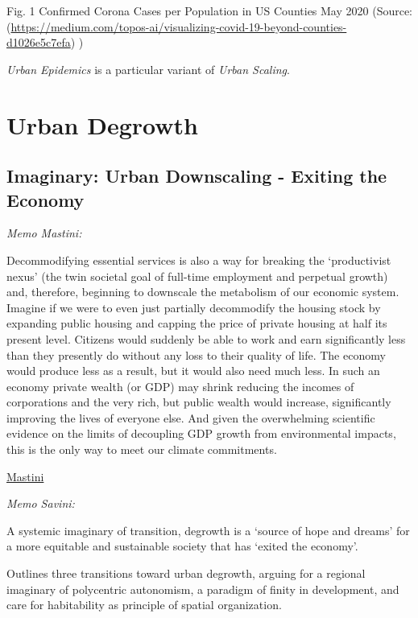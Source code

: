 \documentclass[
]{book}
\begin{document}
Fig. 1 Confirmed Corona Cases per Population in US Counties May 2020 (Source: \citep[ medium.com]{topos_ai}(\url{https://medium.com/topos-ai/visualizing-covid-19-beyond-counties-d1026e5c7efa}) )

\emph{Urban Epidemics} is a particular variant of \emph{Urban Scaling}.

\hypertarget{urban-degrowth}{%
\chapter{Urban Degrowth}\label{urban-degrowth}}

\hypertarget{imaginary-urban-downscaling---exiting-the-economy}{%
\section{Imaginary: Urban Downscaling - Exiting the Economy}\label{imaginary-urban-downscaling---exiting-the-economy}}

\emph{Memo Mastini:}

Decommodifying essential services is also a way for breaking the `productivist nexus' (the twin societal goal of full-time employment and perpetual growth) and, therefore, beginning to downscale the metabolism of our economic system. Imagine if we were to even just partially decommodify the housing stock by expanding public housing and capping the price of private housing at half its present level. Citizens would suddenly be able to work and earn significantly less than they presently do without any loss to their quality of life. The economy would produce less as a result, but it would also need much less. In such an economy private wealth (or GDP) may shrink reducing the incomes of corporations and the very rich, but public wealth would increase, significantly improving the lives of everyone else. And given the overwhelming scientific evidence on the limits of decoupling GDP growth from environmental impacts, this is the only way to meet our climate commitments.

\href{https://www.slu.se/en/Collaborative-Centres-and-Projects/slu-urban-future/activities/urban-readings/housing-for-a-socio-ecological-transformation/}{Mastini}

\emph{Memo Savini:}

A systemic imaginary of transition,
degrowth is a `source of hope and dreams'
for a more equitable and sustainable society
that has `exited the economy'.

Outlines three transitions toward urban degrowth,
arguing for a regional imaginary of polycentric autonomism,
a paradigm of finity in development,
and care for habitability as principle of spatial organization.
\end{document}

